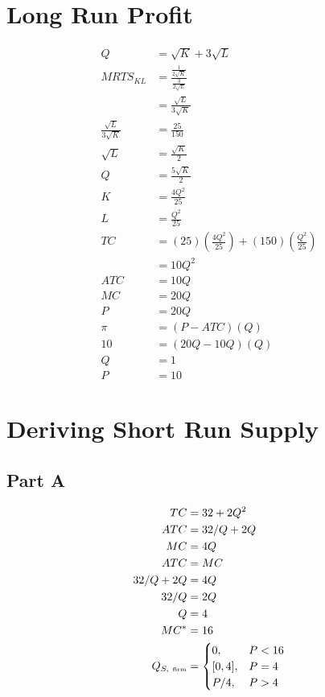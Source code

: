 \documentclass[8pt]{extarticle}
\begin{document}
{\section*{Long Run Profit}
\begin{align*}
	Q &= \sqrt{K} + 3\sqrt{L} \\
	MRTS_{KL} &= \frac{\frac{1}{2\sqrt{K}} }{\frac{3}{2\sqrt{L}}} \\
	&= \frac{\sqrt{L}}{3\sqrt{K}}\\
	\frac{\sqrt{L}}{3\sqrt{K}} &= \frac{25}{150} \\
	\sqrt{L} &= \frac{\sqrt{K}}{2} \\
	Q &= \frac{5\sqrt{K}}{2} \\
	K &= \frac{4Q^2}{25}\\
	L &= \frac{Q^2}{25}\\
	TC &= (25)\left(\frac{4Q^2}{25}\right) + (150)\left(\frac{Q^2}{25}\right) \\
	&= 10Q^2\\
	ATC &= 10Q\\
	MC &= 20Q\\
	P &= 20Q \\
	\pi &= (P - ATC)(Q) \\
	10 &= (20Q - 10Q)(Q) \\
	Q &= 1\\
	P &= \boxed{10}
\end{align*}

\section*{Deriving Short Run Supply}
\subsection*{Part A}
\begin{align*}
	TC &= 32 + 2Q^2\\
	ATC &= 32/Q + 2Q \\
	MC &= 4Q\\
	ATC &= MC \\
	32/Q + 2Q &= 4Q\\
	32/Q &= 2Q \\
	Q &= 4\\
	MC^{*} &= 16 \\
	Q_{S,~\textrm{\tiny firm}} &= \begin{cases}
		0, & P<16 \\
		[0,4], & P=4 \\
		P/4, & P>4
	\end{cases}
\end{align*}
}
\end{document}

